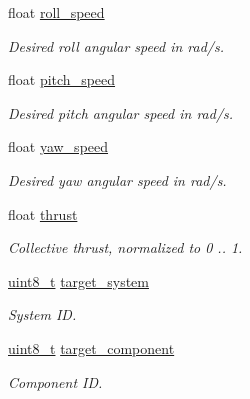 \begin{DoxyCompactItemize}
\item 
float \hyperlink{struct____mavlink__set__roll__pitch__yaw__speed__thrust__t_a5e01bd44de6632b3e1fe3bbb5e6c99ce}{roll\-\_\-speed}
\begin{DoxyCompactList}\small\item\em Desired roll angular speed in rad/s. \end{DoxyCompactList}\item 
float \hyperlink{struct____mavlink__set__roll__pitch__yaw__speed__thrust__t_aa9115ddbf417ab7ed71bcc825fd3c63a}{pitch\-\_\-speed}
\begin{DoxyCompactList}\small\item\em Desired pitch angular speed in rad/s. \end{DoxyCompactList}\item 
float \hyperlink{struct____mavlink__set__roll__pitch__yaw__speed__thrust__t_a1c7a83d7c5c3eed691a75f329fbde2f6}{yaw\-\_\-speed}
\begin{DoxyCompactList}\small\item\em Desired yaw angular speed in rad/s. \end{DoxyCompactList}\item 
float \hyperlink{struct____mavlink__set__roll__pitch__yaw__speed__thrust__t_aded7b57218b5f75ac1247c3034bfd04f}{thrust}
\begin{DoxyCompactList}\small\item\em Collective thrust, normalized to 0 .. 1. \end{DoxyCompactList}\item 
\hyperlink{stdint_8h_aba7bc1797add20fe3efdf37ced1182c5}{uint8\-\_\-t} \hyperlink{struct____mavlink__set__roll__pitch__yaw__speed__thrust__t_a2a8b7411787c7696ac39b65c836c6156}{target\-\_\-system}
\begin{DoxyCompactList}\small\item\em System I\-D. \end{DoxyCompactList}\item 
\hyperlink{stdint_8h_aba7bc1797add20fe3efdf37ced1182c5}{uint8\-\_\-t} \hyperlink{struct____mavlink__set__roll__pitch__yaw__speed__thrust__t_a5b687c149bcad6c9b0bb53e489bff0a0}{target\-\_\-component}
\begin{DoxyCompactList}\small\item\em Component I\-D. \end{DoxyCompactList}\end{DoxyCompactItemize}


